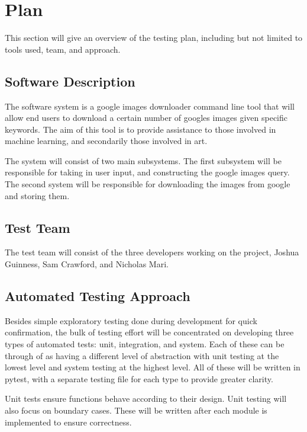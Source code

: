 \documentclass[12pt, titlepage]{article}
\begin{document}
\section{Plan} 

This section will give an overview of the testing plan, including but not limited to tools used, team, and approach.
	
\subsection{Software Description}

The software system is a google images downloader command line tool that will allow end users to download a certain number of googles images given specific keywords. The aim of this tool is to provide assistance to those involved in machine learning, and secondarily those involved in art.

The system will consist of two main subsystems. The first subsystem will be responsible for taking in user input, and constructing the google images query. The second system will be responsible for downloading the images from google and storing them. 

\subsection{Test Team}

The test team will consist of the three developers working on the project, Joshua Guinness, Sam Crawford, and Nicholas Mari.

\subsection{Automated Testing Approach}

Besides simple exploratory testing done during development for quick confirmation, the bulk of testing effort will be concentrated on developing three types of automated tests: unit, integration, and system. Each of these can be through of as having a different level of abstraction with unit testing at the lowest level and system testing at the highest level. All of these will be written in pytest, with a separate testing file for each type to provide greater clarity.

Unit tests ensure functions behave according to their design. Unit testing will also focus on boundary cases. These will be written after each module is implemented to ensure correctness.
\end{document}
